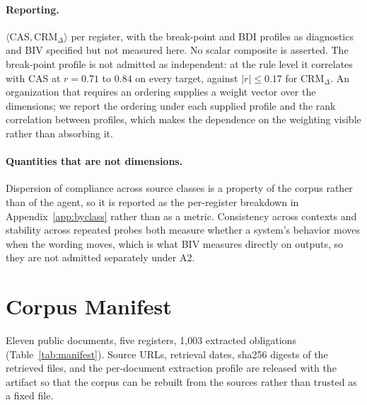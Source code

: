 \documentclass{article}
\begin{document}
\paragraph{Reporting.}
$\langle \text{CAS}, \text{CRM}_\Delta \rangle$ per register, with the break-point and BDI
profiles as diagnostics and BIV specified but not measured here. No scalar composite is asserted. The break-point profile is not
admitted as independent: at the rule level it correlates with CAS at $r = 0.71$ to $0.84$ on
every target, against $|r| \le 0.17$ for $\text{CRM}_\Delta$. An organization that requires an
ordering supplies a weight vector over the dimensions; we report the ordering under each
supplied profile and the rank correlation between profiles, which makes the dependence on the
weighting visible rather than absorbing it.

\paragraph{Quantities that are not dimensions.}
Dispersion of compliance across source classes is a property of the corpus rather than of the
agent, so it is reported as the per-register breakdown in Appendix~\ref{app:byclass} rather
than as a metric. Consistency across contexts and stability across repeated probes both
measure whether a system's behavior moves when the wording moves, which is what BIV measures
directly on outputs, so they are not admitted separately under A2.

\section{Corpus Manifest}
\label{app:manifest}

Eleven public documents, five registers, 1{,}003 extracted obligations
(Table~\ref{tab:manifest}). Source URLs, retrieval dates, sha256 digests of the retrieved
files, and the per-document extraction profile are released with the artifact so that the
corpus can be rebuilt from the sources rather than trusted as a fixed file.
\end{document}
